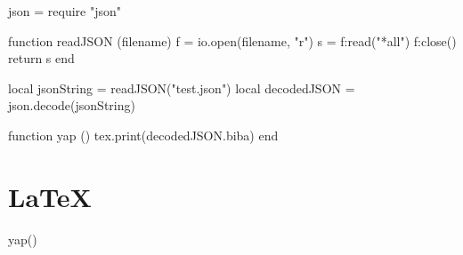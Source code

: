 \documentclass{article}
\begin{document}
\begin{luacode}
json = require "json"

function readJSON (filename)
    f = io.open(filename, "r")
    s = f:read("*all")
    f:close()
    return s
end

local jsonString = readJSON("test.json")
local decodedJSON = json.decode(jsonString)

function yap ()
    tex.print(decodedJSON.biba)
end
\end{luacode}

\section{\LaTeX{}}

\begin{luacode}
yap()
\end{luacode}
\end{document}
